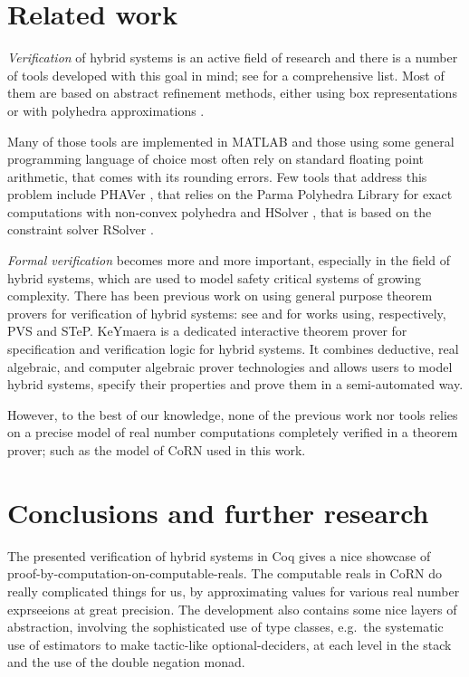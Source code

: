 \documentclass[runningheads]{llncs}
\begin{document}
\section{Related work}

\emph{Verification} of hybrid systems is an active field of research and
there is a number of tools developed with this goal in mind;
see \cite{HST} for a comprehensive list.
Most of them are based on abstract refinement methods, either
using box representations \cite{Kow96,Kow98}
or with polyhedra approximations \cite{alur,Chu99,Cla03}.

Many of those tools are implemented in MATLAB \cite{MATLAB}
and those using some general programming language of choice
most often rely on standard floating point arithmetic, that
comes with its rounding errors. Few tools that address 
this problem include 
PHAVer \cite{PhaVER}, that relies on the Parma Polyhedra Library \cite{Parma} 
for exact computations with non-convex polyhedra 
and 
HSolver \cite{HSolver}, that is based on the constraint solver 
RSolver \cite{RSolver}.

\emph{Formal verification} becomes more and more important, especially in the
field of hybrid systems, which are used to model safety critical systems 
of growing complexity. There has been previous work on using general purpose 
theorem provers for verification of hybrid systems: see \cite{Mum01,Hen98} 
and \cite{Man98,Man01} for works using, respectively, PVS and STeP. 
KeYmaera \cite{KeYmaera} is a dedicated interactive theorem prover for 
specification and verification logic for hybrid systems. It combines
deductive, real algebraic, and computer algebraic prover technologies
and allows users to model hybrid systems, specify their properties
and prove them in a semi-automated way.

However, to the best of our knowledge, none of the previous work nor tools 
relies on a precise model of real number computations completely verified 
in a theorem prover; such as the model of CoRN used in this work.

\section{Conclusions and further research}
The presented verification of hybrid systems in Coq gives a nice
showcase of proof-by-computation-on-computable-reals. The computable
reals in CoRN do really complicated things for us, by approximating
values for various real number exprseeions at great precision. The
development also contains some nice layers of abstraction, involving
the sophisticated use of type classes, e.g.\ the systematic use of
estimators to make tactic-like optional-deciders, at each level in the
stack and the use of the double negation monad.
\end{document}
